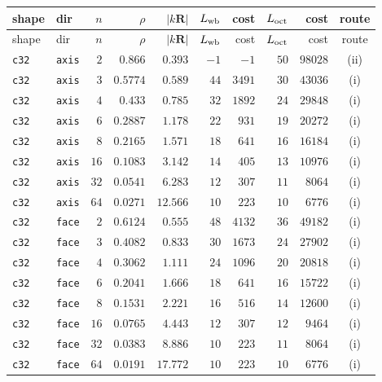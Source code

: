 \begin{longtable}{llrrrrrrrc}
\toprule
shape & dir & $n$ & $\rho$ & $|k\mathbf{R}|$ & $L_{\rm wb}$ & cost & $L_{\rm oct}$ & cost & route \\
\midrule
\endfirsthead
\toprule
shape & dir & $n$ & $\rho$ & $|k\mathbf{R}|$ & $L_{\rm wb}$ & cost & $L_{\rm oct}$ & cost & route \\
\midrule
\endhead
\bottomrule
\endfoot
\texttt{c32} & \texttt{axis} & $2$ & $0.866$ & $0.393$ & $-1$ & $-1$ & $50$ & $98028$ & (ii) \\
\texttt{c32} & \texttt{axis} & $3$ & $0.5774$ & $0.589$ & $44$ & $3491$ & $30$ & $43036$ & (i) \\
\texttt{c32} & \texttt{axis} & $4$ & $0.433$ & $0.785$ & $32$ & $1892$ & $24$ & $29848$ & (i) \\
\texttt{c32} & \texttt{axis} & $6$ & $0.2887$ & $1.178$ & $22$ & $931$ & $19$ & $20272$ & (i) \\
\texttt{c32} & \texttt{axis} & $8$ & $0.2165$ & $1.571$ & $18$ & $641$ & $16$ & $16184$ & (i) \\
\texttt{c32} & \texttt{axis} & $16$ & $0.1083$ & $3.142$ & $14$ & $405$ & $13$ & $10976$ & (i) \\
\texttt{c32} & \texttt{axis} & $32$ & $0.0541$ & $6.283$ & $12$ & $307$ & $11$ & $8064$ & (i) \\
\texttt{c32} & \texttt{axis} & $64$ & $0.0271$ & $12.566$ & $10$ & $223$ & $10$ & $6776$ & (i) \\
\texttt{c32} & \texttt{face} & $2$ & $0.6124$ & $0.555$ & $48$ & $4132$ & $36$ & $49182$ & (i) \\
\texttt{c32} & \texttt{face} & $3$ & $0.4082$ & $0.833$ & $30$ & $1673$ & $24$ & $27902$ & (i) \\
\texttt{c32} & \texttt{face} & $4$ & $0.3062$ & $1.111$ & $24$ & $1096$ & $20$ & $20818$ & (i) \\
\texttt{c32} & \texttt{face} & $6$ & $0.2041$ & $1.666$ & $18$ & $641$ & $16$ & $15722$ & (i) \\
\texttt{c32} & \texttt{face} & $8$ & $0.1531$ & $2.221$ & $16$ & $516$ & $14$ & $12600$ & (i) \\
\texttt{c32} & \texttt{face} & $16$ & $0.0765$ & $4.443$ & $12$ & $307$ & $12$ & $9464$ & (i) \\
\texttt{c32} & \texttt{face} & $32$ & $0.0383$ & $8.886$ & $10$ & $223$ & $11$ & $8064$ & (i) \\
\texttt{c32} & \texttt{face} & $64$ & $0.0191$ & $17.772$ & $10$ & $223$ & $10$ & $6776$ & (i) \\

\end{longtable}

